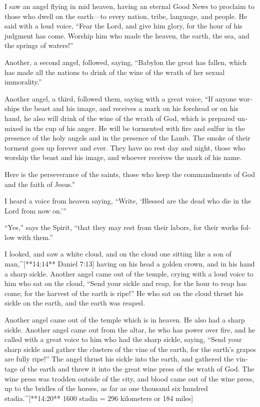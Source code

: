 \begin{paracols}{2}
\begin{english}
 I saw an angel flying in mid heaven, having an eternal Good News to proclaim to those who dwell on the earth—to every nation, tribe, language, and people.  He said with a loud voice, “Fear the Lord, and give him glory, for the hour of his judgment has come. Worship him who made the heaven, the earth, the sea, and the springs of waters!” 

 Another, a second angel, followed, saying, “Babylon the great has fallen, which has made all the nations to drink of the wine of the wrath of her sexual immorality.” 

 Another angel, a third, followed them, saying with a great voice, “If anyone worships the beast and his image, and receives a mark on his forehead or on his hand,  he also will drink of the wine of the wrath of God, which is prepared unmixed in the cup of his anger. He will be tormented with fire and sulfur in the presence of the holy angels and in the presence of the Lamb.  The smoke of their torment goes up forever and ever. They have no rest day and night, those who worship the beast and his image, and whoever receives the mark of his name. 

 Here is the perseverance of the saints, those who keep the commandments of God and the faith of Jesus.” 

 I heard a voice from heaven saying, “Write, ‘Blessed are the dead who die in the Lord from now on.’” 

“Yes,” says the Spirit, “that they may rest from their labors, for their works follow with them.” 

 I looked, and saw a white cloud, and on the cloud one sitting like a son of man,^[**14:14** Daniel 7:13] having on his head a golden crown, and in his hand a sharp sickle.  Another angel came out of the temple, crying with a loud voice to him who sat on the cloud, “Send your sickle and reap, for the hour to reap has come; for the harvest of the earth is ripe!”  He who sat on the cloud thrust his sickle on the earth, and the earth was reaped. 

 Another angel came out of the temple which is in heaven. He also had a sharp sickle.  Another angel came out from the altar, he who has power over fire, and he called with a great voice to him who had the sharp sickle, saying, “Send your sharp sickle and gather the clusters of the vine of the earth, for the earth’s grapes are fully ripe!”  The angel thrust his sickle into the earth, and gathered the vintage of the earth and threw it into the great wine press of the wrath of God.  The wine press was trodden outside of the city, and blood came out of the wine press, up to the bridles of the horses, as far as one thousand six hundred stadia.^[**14:20** 1600 stadia = 296 kilometers or 184 miles]


\end{english}
\end{paracols}
